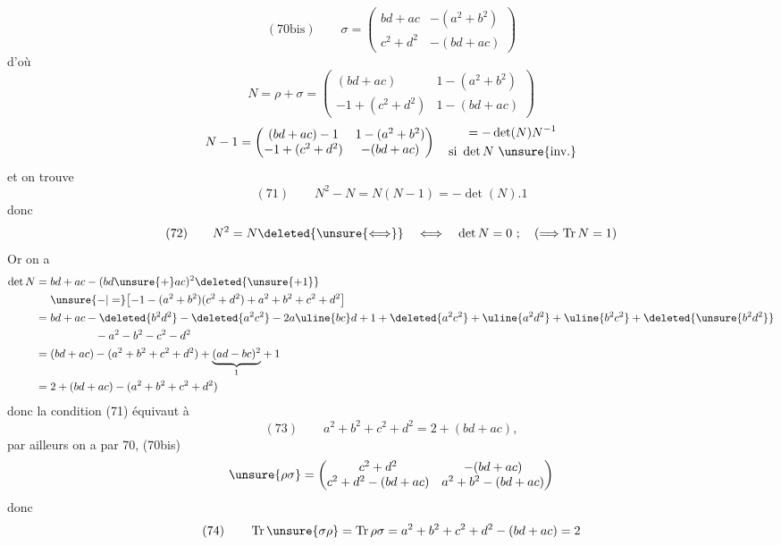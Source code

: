 \[
(70\mathrm{bis})\qquad
\sigma=\begin{pmatrix}
bd+ac&-(a^2+b^2)\\
c^2+d^2&-(bd+ac)
\end{pmatrix}
\]
d'où
\[
N=\rho+\sigma=\begin{pmatrix}
(bd+ac)&1-(a^2+b^2)\\
-1+(c^2+d^2)&1-(bd+ac)
\end{pmatrix}
\]
\[
N-1=\begin{pmatrix}
(bd+ac)-1&1-(a^2+b^2)\\
-1+(c^2+d^2)&-(bd+ac)
\end{pmatrix}
\quad\begin{gathered}
=-\det(N)N^{-1}\\
\text{si }\det N\text{ \unsure{inv.}}
\end{gathered}
\]
et on trouve
\[
(71)\qquad N^2-N=N(N-1)=-\det(N).1
\]
donc 
\[
(72)\qquad N^2=N\deleted{\unsure{\Longleftrightarrow}}\quad\Longleftrightarrow\quad\det N=0\ ;\quad(\Longrightarrow\operatorname{Tr}N=1)
\]
Or on a
\[
\begin{aligned}
\det N={}&bd+ac-(bd\unsure{+}ac)^2\deleted{\unsure{+1}}\\
&\unsure{-|=}\bigl[-1-(a^2+b^2)(c^2+d^2)+a^2+b^2+c^2+d^2\bigr]\\
={}&bd+ac-\deleted{b^2d^2}-\deleted{a^2c^2}-2a\uline{bc}d+1
+\deleted{a^2c^2}+\uline{a^2d^2}+\uline{b^2c^2}+\deleted{\unsure{b^2d^2}}\\
&\hspace{4em}-a^2-b^2-c^2-d^2\\
={}&(bd+ac)-(a^2+b^2+c^2+d^2)+\underset{1}{\underbrace{(ad-bc)^2}}+1\\
={}&2+(bd+ac)-(a^2+b^2+c^2+d^2)
\end{aligned}
\]
donc la condition (71) équivaut à
\[
(73)\qquad a^2+b^2+c^2+d^2=2+(bd+ac),
\]
par ailleurs on a par 70, (70bis)
\[
\unsure{\rho\sigma}=\begin{pmatrix}
c^2+d^2&-(bd+ac)\\
c^2+d^2-(bd+ac)&a^2+b^2-(bd+ac)
\end{pmatrix}
\]
donc
\[
(74)\qquad \operatorname{Tr}\unsure{\sigma\rho}=\operatorname{Tr}\rho\sigma
=a^2+b^2+c^2+d^2-(bd+ac)=2
\]
